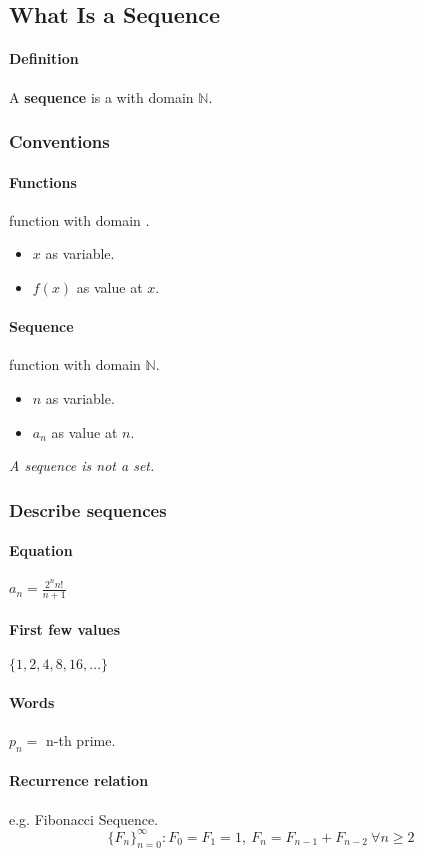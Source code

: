 \documentclass{article}
\begin{document}
\subsection{What Is a Sequence}

\paragraph{Definition} A \textbf{sequence} is a  with domain $\mathbb{N}$.

\subsubsection{Conventions}
\paragraph{Functions} function with domain .
\begin{itemize}
	\item $x$ as variable.
	\item $f(x)$ as value at $x$.
\end{itemize}
\paragraph{Sequence} function with domain $\mathbb{N}$.
\begin{itemize}
	\item $n$ as variable.
	\item $a_n$ as value at $n$.
\end{itemize}

\emph{A sequence is not a set.}

\subsubsection{Describe sequences}
\paragraph{Equation} $a_n = \frac{2^n n!}{n+1}$
\paragraph{First few values} $\{1,2,4,8,16,\dots\}$
\paragraph{Words} $p_n=$ n-th prime.
\paragraph{Recurrence relation} e.g. Fibonacci Sequence.
\[
	\{F_n\}_{n=0}^{\infty}: F_0 = F_1 = 1,\ F_n = F_{n-1} + F_{n-2}\ \forall n \geq 2
\]
\end{document}
